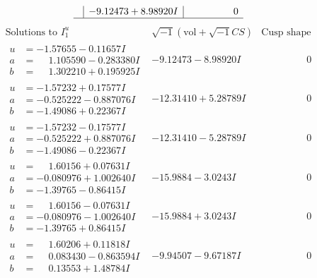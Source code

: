 \documentclass[1p]{elsarticle_modified}
\theoremstyle{definition}
\newcommand{\I}{\sqrt{-1}}
\begin{document}
$$\begin{array}{c|c|c}
 & -9.12473 + 8.98920 I & \phantom{-0.000000 } 0\\
 \hline 
 \end{array}$$\newpage$$\begin{array}{c|c|c}  
\text{Solutions to }I^u_{1}& \I (\text{vol} + \sqrt{-1}CS) & \text{Cusp shape}\\
 \hline 
\begin{aligned}
u &= -1.57655 - 0.11657 I \\
a &= \phantom{-}1.105590 - 0.283380 I \\
b &= \phantom{-}1.302210 + 0.195925 I\end{aligned}
 & -9.12473 - 8.98920 I & \phantom{-0.000000 } 0 \\ \hline\begin{aligned}
u &= -1.57232 + 0.17577 I \\
a &= -0.525222 - 0.887076 I \\
b &= -1.49086 + 0.22367 I\end{aligned}
 & -12.31410 + 5.28789 I & \phantom{-0.000000 } 0 \\ \hline\begin{aligned}
u &= -1.57232 - 0.17577 I \\
a &= -0.525222 + 0.887076 I \\
b &= -1.49086 - 0.22367 I\end{aligned}
 & -12.31410 - 5.28789 I & \phantom{-0.000000 } 0 \\ \hline\begin{aligned}
u &= \phantom{-}1.60156 + 0.07631 I \\
a &= -0.080976 + 1.002640 I \\
b &= -1.39765 - 0.86415 I\end{aligned}
 & -15.9884 - 3.0243 I & \phantom{-0.000000 } 0 \\ \hline\begin{aligned}
u &= \phantom{-}1.60156 - 0.07631 I \\
a &= -0.080976 - 1.002640 I \\
b &= -1.39765 + 0.86415 I\end{aligned}
 & -15.9884 + 3.0243 I & \phantom{-0.000000 } 0 \\ \hline\begin{aligned}
u &= \phantom{-}1.60206 + 0.11818 I \\
a &= \phantom{-}0.083430 - 0.863594 I \\
b &= \phantom{-}0.13553 + 1.48784 I\end{aligned}
 & -9.94507 - 9.67187 I & \phantom{-0.000000 } 0 \\ \hline\begin{aligned}

\end{aligned}
\end{array}$$
\end{document}
